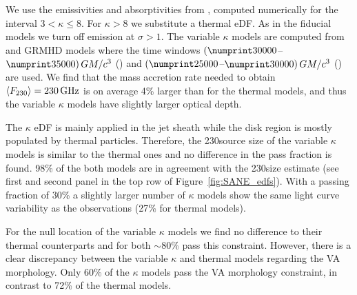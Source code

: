We use the emissivities and absorptivities from  \cite{2016ApJ...822...34P}, computed numerically for the interval $3 < \kappa \le 8$.
For $\kappa > 8$ we substitute a thermal eDF.
As in the fiducial models we turn off emission at $\sigma > 1$.
The variable $\kappa$ models are computed from \hamr and \bhac GRMHD models where the time windows
$(\no{30000}$--$\no{35000})\,\tg$ (\hamr) and
$(\no{25000}$--$\no{30000})\,\tg$ (\bhac) are used.
We find that the mass accretion rate needed to obtain $\langle F_{230} \rangle = 230\,\mathrm{GHz}$ is on average 4\% larger than for the thermal models, and thus the variable $\kappa$ models have slightly larger optical depth. 


The $\kappa$ eDF is mainly applied in the jet sheath while the disk region is mostly populated by thermal particles.
Therefore, the 230\GHz source size of the variable $\kappa$ models is similar to the thermal ones and no difference in the pass fraction is found.
98\% of the both models are in agreement with the 230\GHz size estimate (see first and second panel in the top row of Figure~\ref{fig:SANE_edfs}).
With a passing fraction of 30\% a slightly larger number of $\kappa$ models show the same light curve variability as the observations (27\% for thermal models).


For the null location of the variable $\kappa$ models we find no difference to their thermal counterparts and for both $\sim$80\% pass this constraint.
However, there is a clear discrepancy between the variable $\kappa$ and thermal models regarding the VA morphology.
Only 60\% of the $\kappa$ models pass the VA morphology constraint, in contrast to 72\% of the thermal models.

